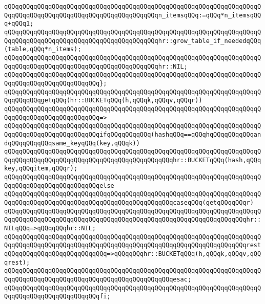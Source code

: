 \verb|qQQqqQQqqQQqqQQqqQQqqQQqqQQqqQQqqQQqqQQqqQQqqQQqqQQqqQQqqQQqqQQqqQQqqQQqqQQqqQQqqQQqqQQqqQQqqQQqqQQqqQQqqQQqqQQqn_itemsqQQq:=qQQq*n_itemsqQQq+qQQq1;|\newline
\verb|qQQqqQQqqQQqqQQqqQQqqQQqqQQqqQQqqQQqqQQqqQQqqQQqqQQqqQQqqQQqqQQqqQQqqQQqqQQqqQQqqQQqqQQqqQQqqQQqqQQqqQQqqQQqqQQqhr::grow_table_if_neededqQQq(table,qQQq*n_items);|\newline
\verb|qQQqqQQqqQQqqQQqqQQqqQQqqQQqqQQqqQQqqQQqqQQqqQQqqQQqqQQqqQQqqQQqqQQqqQQqqQQqqQQqqQQqqQQqqQQqqQQqqQQqqQQqqQQqqQQqhr::NIL;|\newline
\verb|qQQqqQQqqQQqqQQqqQQqqQQqqQQqqQQqqQQqqQQqqQQqqQQqqQQqqQQqqQQqqQQqqQQqqQQqqQQqqQQqqQQqqQQqqQQqqQQq};|\newline
\verb|qQQqqQQqqQQqqQQqqQQqqQQqqQQqqQQqqQQqqQQqqQQqqQQqqQQqqQQqqQQqqQQqqQQqqQQqqQQqqQQqgetqQQq(hr::BUCKETqQQq(h,qQQqk,qQQqv,qQQqr))|\newline
\verb|qQQqqQQqqQQqqQQqqQQqqQQqqQQqqQQqqQQqqQQqqQQqqQQqqQQqqQQqqQQqqQQqqQQqqQQqqQQqqQQqqQQqqQQqqQQqqQQq=>|\newline
\verb|qQQqqQQqqQQqqQQqqQQqqQQqqQQqqQQqqQQqqQQqqQQqqQQqqQQqqQQqqQQqqQQqqQQqqQQqqQQqqQQqqQQqqQQqqQQqqQQqifqQQqqQQqqQQq(hashqQQq==qQQqhqQQqqQQqqQQqandqQQqqQQqqQQqsame_keyqQQq(key,qQQqk))|\newline
\verb|qQQqqQQqqQQqqQQqqQQqqQQqqQQqqQQqqQQqqQQqqQQqqQQqqQQqqQQqqQQqqQQqqQQqqQQqqQQqqQQqqQQqqQQqqQQqqQQqqQQqqQQqqQQqqQQqqQQqhr::BUCKETqQQq(hash,qQQqkey,qQQqitem,qQQqr);|\newline
\verb|qQQqqQQqqQQqqQQqqQQqqQQqqQQqqQQqqQQqqQQqqQQqqQQqqQQqqQQqqQQqqQQqqQQqqQQqqQQqqQQqqQQqqQQqqQQqqQQqelse|\newline
\verb|qQQqqQQqqQQqqQQqqQQqqQQqqQQqqQQqqQQqqQQqqQQqqQQqqQQqqQQqqQQqqQQqqQQqqQQqqQQqqQQqqQQqqQQqqQQqqQQqqQQqqQQqqQQqqQQqqQQqcaseqQQq(getqQQqqQQqr)|\newline
\verb|qQQqqQQqqQQqqQQqqQQqqQQqqQQqqQQqqQQqqQQqqQQqqQQqqQQqqQQqqQQqqQQqqQQqqQQqqQQqqQQqqQQqqQQqqQQqqQQqqQQqqQQqqQQqqQQqqQQqqQQqqQQqqQQqqQQqqQQqhr::NILqQQq=>qQQqqQQqhr::NIL;|\newline
\verb|qQQqqQQqqQQqqQQqqQQqqQQqqQQqqQQqqQQqqQQqqQQqqQQqqQQqqQQqqQQqqQQqqQQqqQQqqQQqqQQqqQQqqQQqqQQqqQQqqQQqqQQqqQQqqQQqqQQqqQQqqQQqqQQqqQQqqQQqrestqQQqqQQqqQQqqQQqqQQqqQQqqQQq=>qQQqqQQqhr::BUCKETqQQq(h,qQQqk,qQQqv,qQQqrest);|\newline
\verb|qQQqqQQqqQQqqQQqqQQqqQQqqQQqqQQqqQQqqQQqqQQqqQQqqQQqqQQqqQQqqQQqqQQqqQQqqQQqqQQqqQQqqQQqqQQqqQQqqQQqqQQqqQQqqQQqqQQqesac;|\newline
\verb|qQQqqQQqqQQqqQQqqQQqqQQqqQQqqQQqqQQqqQQqqQQqqQQqqQQqqQQqqQQqqQQqqQQqqQQqqQQqqQQqqQQqqQQqqQQqqQQqfi;|\newline
